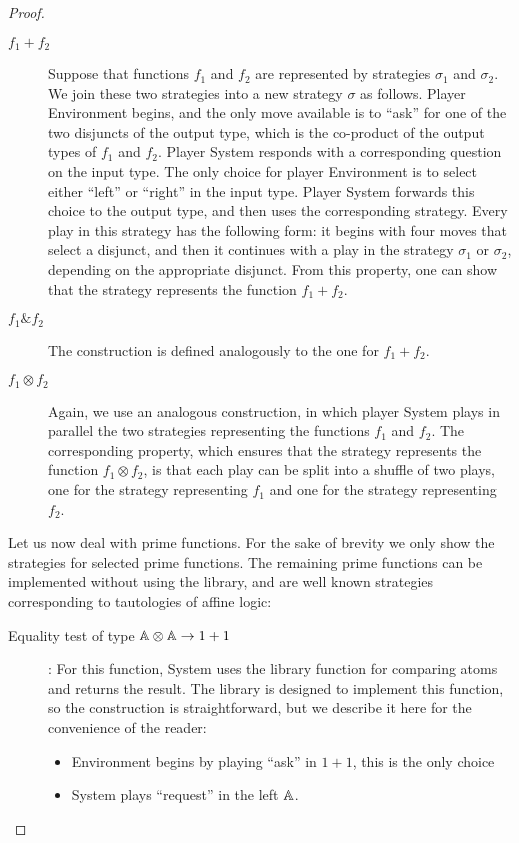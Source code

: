 \begin{proof}
\begin{description}
        \item[$f_1 + f_2$] Suppose that functions $f_1$ and $f_2$ are represented by strategies $\sigma_1$ and $\sigma_2$. We join these two strategies into a new strategy $\sigma$ as follows.  Player Environment begins, and the only move available is to ``ask'' for one of the two disjuncts of the output type, which is the co-product of the output types of $f_1$ and $f_2$. Player System responds with a corresponding question on the input type. The only choice for player Environment is to select either ``left'' or ``right'' in the input type. Player System forwards this choice to the output type, and then uses the corresponding strategy.  Every play in this strategy has the following form: it begins with four moves that select a disjunct, and then it continues with a play in the strategy $\sigma_1$ or $\sigma_2$, depending on  the appropriate disjunct. From this property, one can show that the strategy represents the function $f_1 + f_2$.
        \item[$f_1 \& f_2$]  The construction is defined analogously to the one for $f_1 + f_2$.
        \item[$f_1 \otimes f_2$] Again, we use an analogous construction, in which player System plays in parallel the two strategies representing the functions $f_1$ and $f_2$. The corresponding property, which ensures that the strategy represents the function $f_1 \otimes f_2$, is that each play can be split into a shuffle of two plays, one for the strategy representing $f_1$ and one for the strategy representing $f_2$.
    \end{description}
    Let us now deal with prime functions. For the sake of brevity we only show the strategies for selected prime functions. The remaining prime functions can be implemented without using  the library, and are well known strategies corresponding to tautologies of affine logic:
    \begin{description}
        \item[Equality test of type $\mathbb A \otimes \mathbb A \to 1 + 1$]:
        For this function, System uses the library function for comparing atoms 
        and returns the result. The library is designed to implement this function, so the construction is straightforward, but we describe it here for the convenience of the reader:
\begin{itemize}
    \item Environment begins by  playing ``ask'' in $1+1$, this is the only choice
    \item System  plays  ``request'' in the left $\mathbb A$.

\end{itemize}
\end{description}
\end{proof}
